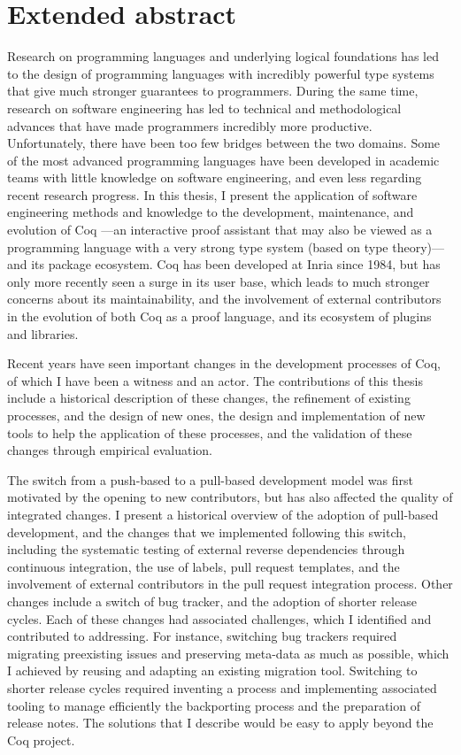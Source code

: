 \clearpage

\chapter*{Extended abstract}

Research on programming languages and underlying logical foundations has led to the design of programming languages with incredibly powerful type systems that give much stronger guarantees to programmers.
During the same time, research on software engineering has led to technical and methodological advances that have made programmers incredibly more productive.
Unfortunately, there have been too few bridges between the two domains. Some of the most advanced programming languages have been developed in academic teams with little knowledge on software engineering, and even less regarding recent research progress.
In this thesis, I present the application of software engineering methods and knowledge to the development, maintenance, and evolution of Coq ---an interactive proof assistant that may also be viewed as a programming language with a very strong type system (based on type theory)--- and its package ecosystem.
Coq has been developed at Inria since 1984, but has only more recently seen a surge in its user base, which leads to much stronger concerns about its maintainability, and the involvement of external contributors in the evolution of both Coq as a proof language, and its ecosystem of plugins and libraries.

Recent years have seen important changes in the development processes of Coq, of which I have been a witness and an actor.
The contributions of this thesis include a historical description of these changes, the refinement of existing processes, and the design of new ones, the design and implementation of new tools to help the application of these processes, and the validation of these changes through empirical evaluation.

The switch from a push-based to a pull-based development model was first motivated by the opening to new contributors, but has also affected the quality of integrated changes.
I present a historical overview of the adoption of pull-based development, and the changes that we implemented following this switch, including the systematic testing of external reverse dependencies through continuous integration, the use of labels, pull request templates, and the involvement of external contributors in the pull request integration process.
Other changes include a switch of bug tracker, and the adoption of shorter release cycles.
Each of these changes had associated challenges, which I identified and contributed to addressing.
For instance, switching bug trackers required migrating preexisting issues and preserving meta-data as much as possible, which I achieved by reusing and adapting an existing migration tool.
Switching to shorter release cycles required inventing a process and implementing associated tooling to manage efficiently the backporting process and the preparation of release notes.
The solutions that I describe would be easy to apply beyond the Coq project.

